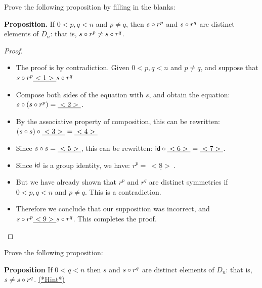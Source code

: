 \begin{exercise}{}
Prove the following proposition by filling in the blanks:
\medskip

\noindent \textbf{Proposition.} 
If $0< p,q < n$ and $p \neq q$, then $s \circ r^p$ and $s \circ r^q$ are distinct elements of $D_n$: that is, $s\circ r^p \neq s \circ r^q$.
\medskip

\begin{proof}
\begin{itemize}
\item
 The proof is by contradiction. Given  $0< p,q < n$ and  $p \neq q$, and suppose that $s \circ r^p  \underline{~<1>~} s \circ r^q$
\item
Compose both sides of the equation with $s$, and obtain the equation:  $s \circ (s \circ r^p) =  \underline{~<2>~} $.
\item
By the associative property of composition, this can be rewritten: $(s \circ s) \circ \underline{~<3>~}  =  \underline{~<4>~}$
\item
Since $s \circ s = \underline{~<5>~}$, this can be rewritten: ${\sf{i}d} \circ \underline{~<6>~}  =  \underline{~<7>~}$.
\item
Since ${\sf{i}d}$ is a group identity, we have: $r^p = \underline{~<8>~}$.
\item
But we have already shown that $r^p$ and $r^q$ are distinct symmetries if $0< p,q < n$ and  $p \neq q$. This is a contradiction.
\item
Therefore we conclude that our supposition was incorrect, and $s \circ r^p  \underline{~<9>~} s \circ r^q$. This completes the proof.
\end{itemize}
\end{proof}
\end{exercise}

\begin{exercise}{33}
Prove the following proposition: 
\medskip

\noindent
\textbf{Proposition}
If $0< q < n$  then $s$ and $s \circ r^q$ are distinct elements of $D_n$: that is, $s \neq s \circ r^q$.
\medskip
\hyperref[sec:symmetries:hints]{(*Hint*)}
\end{exercise}

